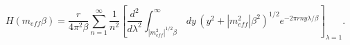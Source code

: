 \begin{equation}
H\left(m_{eff}\beta \right)=\frac{r}{4\pi ^{2}\beta }\sum _{n=1}^{\infty }\frac{1}{n^{2}}\left[\frac{d^{2}}{d\lambda ^{2}}\int _{\left|m_{eff}^{2}\right|^{1/2}\beta }^{\infty }\, dy\, \left(y^{2}+\left|m_{eff}^{2}\right|\beta ^{2}\right)^{1/2}e^{-2\pi rny\lambda /\beta }\right]_{\lambda =1}.\end{equation}

